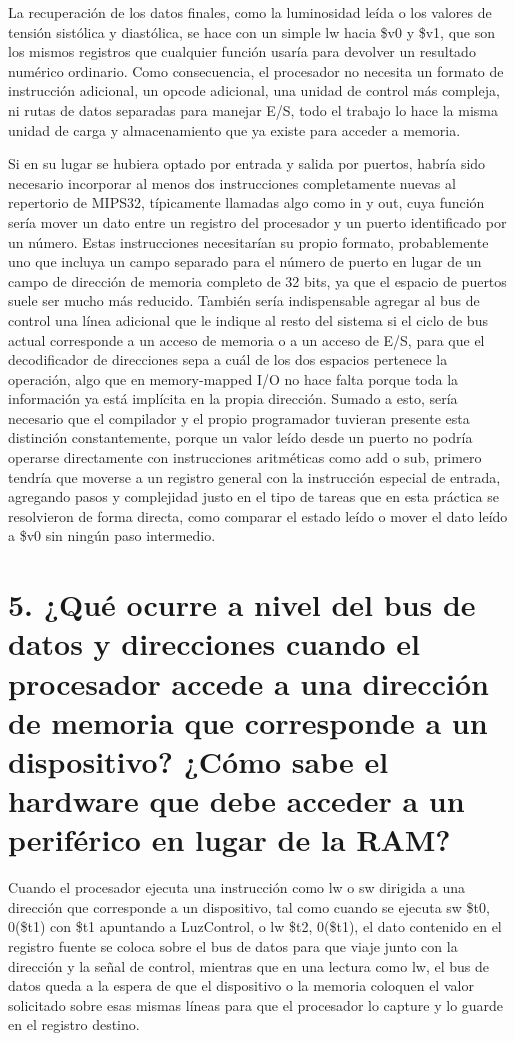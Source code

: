 \documentclass[12pt, letterpaper]{article}
\begin{document}
La recuperación de los datos finales, como la luminosidad leída o los valores de tensión sistólica y diastólica, se hace con un simple lw hacia \$v0 y \$v1, que son los mismos registros que cualquier función usaría para devolver un resultado numérico ordinario. Como consecuencia, el procesador no necesita un formato de instrucción adicional, un opcode adicional, una unidad de control más compleja, ni rutas de datos separadas para manejar E/S, todo el trabajo lo hace la misma unidad de carga y almacenamiento que ya existe para acceder a memoria.

Si en su lugar se hubiera optado por entrada y salida por puertos, habría sido necesario incorporar al menos dos instrucciones completamente nuevas al repertorio de MIPS32, típicamente llamadas algo como in y out, cuya función sería mover un dato entre un registro del procesador y un puerto identificado por un número. Estas instrucciones necesitarían su propio formato, probablemente uno que incluya un campo separado para el número de puerto en lugar de un campo de dirección de memoria completo de 32 bits, ya que el espacio de puertos suele ser mucho más reducido. También sería indispensable agregar al bus de control una línea adicional que le indique al resto del sistema si el ciclo de bus actual corresponde a un acceso de memoria o a un acceso de E/S, para que el decodificador de direcciones sepa a cuál de los dos espacios pertenece la operación, algo que en memory-mapped I/O no hace falta porque toda la información ya está implícita en la propia dirección. Sumado a esto, sería necesario que el compilador y el propio programador tuvieran presente esta distinción constantemente, porque un valor leído desde un puerto no podría operarse directamente con instrucciones aritméticas como add o sub, primero tendría que moverse a un registro general con la instrucción especial de entrada, agregando pasos y complejidad justo en el tipo de tareas que en esta práctica se resolvieron de forma directa, como comparar el estado leído o mover el dato leído a \$v0 sin ningún paso intermedio.\newpage

\section*{\textbf{5. ¿Qué ocurre a nivel del bus de datos y direcciones cuando el procesador accede a una dirección de memoria que corresponde a un dispositivo? ¿Cómo sabe el hardware que debe acceder a un periférico en lugar de la RAM?}}

Cuando el procesador ejecuta una instrucción como lw o sw dirigida a una dirección que corresponde a un dispositivo, tal como cuando se ejecuta sw \$t0, 0(\$t1) con \$t1 apuntando a LuzControl, o lw \$t2, 0(\$t1), el dato contenido en el registro fuente se coloca sobre el bus de datos para que viaje junto con la dirección y la señal de control, mientras que en una lectura como lw, el bus de datos queda a la espera de que el dispositivo o la memoria coloquen el valor solicitado sobre esas mismas líneas para que el procesador lo capture y lo guarde en el registro destino.
\end{document}
